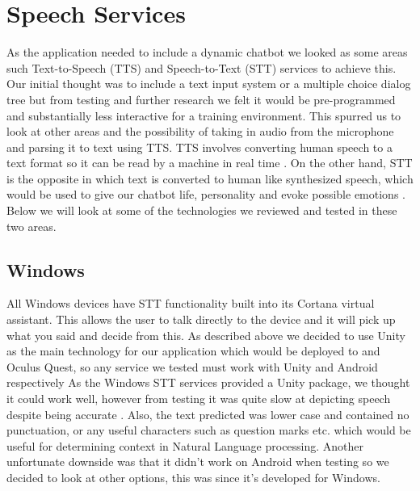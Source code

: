 \section{Speech Services}
As the application needed to include a dynamic chatbot we looked as some areas such Text-to-Speech (TTS) and Speech-to-Text (STT) services to achieve this. Our initial thought was to include a text input system or a multiple choice dialog tree but from testing and further research we felt it would be pre-programmed and substantially less interactive for a training environment. This spurred us to look at other areas and the possibility of taking in audio from the microphone and parsing it to text using TTS. TTS involves converting human speech to a text format so it can be read by a machine in real time \cite{EJ122858920190101}. On the other hand, STT is the opposite in which text is converted to human like synthesized speech, which would be used to give our chatbot life, personality and evoke possible emotions \cite{ED60067020190801}. Below we will look at some of the technologies we reviewed and tested in these two areas.

\subsection{Windows}
All Windows devices have STT functionality built into its Cortana virtual assistant. This allows the user to talk directly to the device and it will pick up what you said and decide from this. As described above we decided to use Unity as the main technology for our application which would be deployed to and Oculus Quest, so any service we tested must work with Unity and Android respectively  As the Windows STT services provided a Unity package, we thought it could work well, however from testing it was quite slow at depicting speech despite being accurate \cite{unityspeech}. Also, the text predicted was lower case and contained no punctuation, or any useful characters such as question marks etc. which would be useful for determining context in Natural Language processing. Another unfortunate downside was that it didn't work on Android when testing so we decided to look at other options, this was since it's developed for Windows. 

